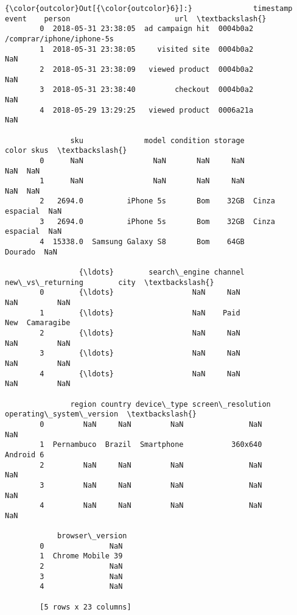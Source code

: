 \documentclass[11pt]{article}
\begin{document}
\begin{Verbatim}[commandchars=\\\{\}]
{\color{outcolor}Out[{\color{outcolor}6}]:}              timestamp            event    person                        url  \textbackslash{}
        0  2018-05-31 23:38:05  ad campaign hit  0004b0a2  /comprar/iphone/iphone-5s   
        1  2018-05-31 23:38:05     visited site  0004b0a2                        NaN   
        2  2018-05-31 23:38:09   viewed product  0004b0a2                        NaN   
        3  2018-05-31 23:38:40         checkout  0004b0a2                        NaN   
        4  2018-05-29 13:29:25   viewed product  0006a21a                        NaN   
        
               sku              model condition storage           color skus  \textbackslash{}
        0      NaN                NaN       NaN     NaN             NaN  NaN   
        1      NaN                NaN       NaN     NaN             NaN  NaN   
        2   2694.0          iPhone 5s       Bom    32GB  Cinza espacial  NaN   
        3   2694.0          iPhone 5s       Bom    32GB  Cinza espacial  NaN   
        4  15338.0  Samsung Galaxy S8       Bom    64GB         Dourado  NaN   
        
                 {\ldots}        search\_engine channel new\_vs\_returning        city  \textbackslash{}
        0        {\ldots}                  NaN     NaN              NaN         NaN   
        1        {\ldots}                  NaN    Paid              New  Camaragibe   
        2        {\ldots}                  NaN     NaN              NaN         NaN   
        3        {\ldots}                  NaN     NaN              NaN         NaN   
        4        {\ldots}                  NaN     NaN              NaN         NaN   
        
               region country device\_type screen\_resolution operating\_system\_version  \textbackslash{}
        0         NaN     NaN         NaN               NaN                      NaN   
        1  Pernambuco  Brazil  Smartphone           360x640                Android 6   
        2         NaN     NaN         NaN               NaN                      NaN   
        3         NaN     NaN         NaN               NaN                      NaN   
        4         NaN     NaN         NaN               NaN                      NaN   
        
            browser\_version  
        0               NaN  
        1  Chrome Mobile 39  
        2               NaN  
        3               NaN  
        4               NaN  
        
        [5 rows x 23 columns]
\end{Verbatim}
            
\end{document}
